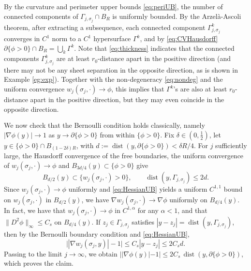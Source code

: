 \documentclass[11pt]{article}
\numberwithin{equation}{section}
\theoremstyle{definition}
\begin{document}
By the curvature and perimeter upper bounds \eqref{eq:periUB}, the number of connected components of $\Gamma_{j,\sigma_j} \cap B_R$ is uniformly bounded. By the Arzel\`a-Ascoli theorem, after extracting a subsequence, each connected component $\Gamma_{j,\sigma_j}^k$ converges in $C^{1}$ norm to a $C^1$ hypersurface $\Gamma^k$, and by \eqref{eq:CVHausdorff} $\partial\{\phi>0\} \cap B_R =\bigcup_{k}\Gamma^k$. Note that \eqref{eq:thickness} indicates that the connected components $\Gamma_{j,\sigma_j}^k$ are at least $r_0$-distance apart in the positive direction (and there may not be any sheet separation in the opposite direction, as is shown in Example \ref{eg:exp}). Together with the non-degeneracy \eqref{eq:nondeg} and the uniform convergence $w_j(\sigma_j,\cdot) \to \phi$, this implies that $\Gamma^k$'s are also at least $r_0$-distance apart in the positive direction, but they may even coincide in the opposite direction.


We now check that the Bernoulli condition holds classically, namely $|\nabla \phi(y)|\to 1$ as $y\to \partial\{\phi>0\}$ from within $\{\phi>0\}$. Fix $\delta\in(0,\tfrac12)$, let $y\in \{\phi>0\}\cap B_{(1-2\delta)R}$, with $d:=\operatorname{dist}(y,\partial\{\phi>0\})<\delta R/4$. For $j$ sufficiently large, the Hausdorff convergence of the free boundaries, the uniform convergence of $w_j(\sigma_j,\cdot) \to \phi$ and $B_{3d/4}(y) \subset \{\phi>0\}$ give
\[
B_{d/2}(y)\subset \{w_j(\sigma_j,\cdot)>0\}, \qquad \operatorname{dist}(y,\Gamma_{j,\sigma_j})\leq 2d.
\]
Since $w_j(\sigma_j,\cdot)\to\phi$ uniformly and \eqref{eq:HessianUB} yields a uniform $C^{1,1}$ bound on $w_j(\sigma_j,\cdot)$ in $B_{d/2}(y)$, we have $\nabla w_j(\sigma_j,\cdot)\to \nabla \phi$ uniformly on $B_{d/4}(y)$. 
In fact, we have that $w_j(\sigma_j, \cdot) \to \phi$ in $C^{1,\alpha}$ for any $\alpha<1$, and that $\|D^2\phi\|_\infty \leq C_s$ on $B_{d/4}(y)$.
If $z_j\in \Gamma_{j,\sigma_j}$ satisfies $|y-z_j|=\operatorname{dist}(y,\Gamma_{j,\sigma_j})$, then by the Bernoulli boundary condition and \eqref{eq:HessianUB},
\[
\bigl||\nabla w_j(\sigma_j,y)|-1\bigr|
\leq C_s |y-z_j|
\leq 2C_s d.
\]
Passing to the limit $j\to\infty$, we obtain $||\nabla \phi(y)|-1|\leq 2C_s\,\operatorname{dist}(y,\partial\{\phi>0\})$, which proves the claim.
\end{document}
